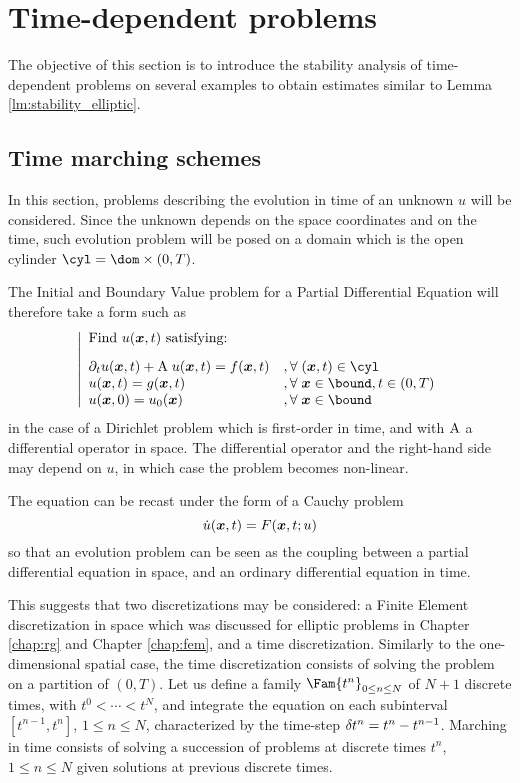 
\chapter{Time-dependent problems}\label{chap:td}

The objective of this section is to introduce the \apriori stability analysis of time-dependent problems on several examples to obtain estimates similar to Lemma \ref{lm:stability_elliptic}.

\section{Time marching schemes}

In this section, problems describing the evolution in time of an unknown $u$ will be considered.
Since the unknown depends on the space coordinates and on the time, such evolution problem will be posed on a domain which is the open cylinder $\cyl = \dom \times (0,T)$.

\medskip
The Initial and Boundary Value problem for a Partial Differential Equation will therefore take a form such as
\begin{equation*}
\left\lvert
\begin{array}{ll}
\mbox{Find $u(\xx, t)$ satisfying:}&\\[2ex]
\partial_t u(\xx,t) + \matA\;u(\xx,t) = f(\xx,t) &, \forany(\xx,t)\in\cyl\\
u(\xx,t) = g(\xx,t) &, \forany\xx\in\bound, t\in(0,T) \\
u(\xx,0) = u_0(\xx) &, \forany\xx\in\bound
\end{array}
\right.
\end{equation*}
in the case of a Dirichlet problem which is first-order in time, and with ${\mathrm A}$ a differential operator in space.
The differential operator and the right-hand side may depend on $u$, in which case the problem becomes non-linear.

\medskip
The equation can be recast under the form of a Cauchy problem
\begin{equation}\label{eq:td_cauchy}
\dot u({{\boldsymbol x}},t) = F({{\boldsymbol x}},t; u)
\end{equation}
so that an evolution problem can be seen as the coupling between a partial differential equation in space, and an ordinary differential equation in time.

This suggests that two discretizations may be considered: a Finite Element discretization in space which was discussed for elliptic problems in Chapter \ref{chap:rg} and Chapter \ref{chap:fem}, and a time discretization.
Similarly to the one-dimensional spatial case, the time discretization consists of solving the problem on a partition of $(0,T)$.
Let us define a family $\Fam{t^n}_{0\leq n \leq N}$ of $N+1$ discrete times, with $t^0 < \cdots < t^N$, and integrate the equation on each subinterval $[t^{n-1}, t^{n}]$, $1\leq n \leq N$, characterized by the time-step $\delta \hspace{-0.05ex} t^n = t^{n} - t^{n-1}$.
Marching in time consists of solving a succession of problems at discrete times $t^n$, $1\leq n \leq N$ given solutions at previous discrete times.

